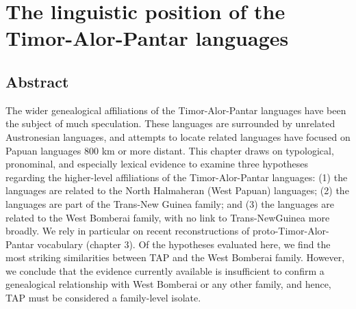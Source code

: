 
\chapter{The linguistic position of the Timor-Alor-Pantar languages}
\section*{Abstract}
The wider genealogical affiliations of the Timor-Alor-Pantar languages have been the subject of much speculation. These languages are surrounded by unrelated Austronesian languages, and attempts to locate related languages have focused on Papuan languages 800 km or more distant. This chapter draws on typological, pronominal, and especially lexical evidence to examine three hypotheses regarding the higher-level affiliations of the Timor-Alor-Pantar languages: (1) the languages are related to the North Halmaheran (West Papuan) languages; (2) the languages are part of the Trans-New Guinea family; and (3) the languages are related to the West Bomberai family, with no link to Trans-NewGuinea more broadly. We rely in particular on recent reconstructions of proto-Timor-Alor-Pantar vocabulary (chapter 3). Of the hypotheses evaluated here, we find the most striking similarities between TAP and the West Bomberai family. However, we conclude that the evidence currently available is insufficient to confirm a
genealogical relationship with West Bomberai or any other family, and hence, TAP must be considered a family-level isolate.

